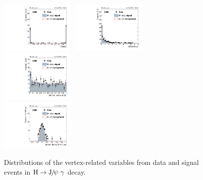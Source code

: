 \begin{figure}[p]
		  \includegraphics[width=0.32\textwidth]{Fig/Final_NoPreliminary/HJpsiG/CosAlpha_Norm_Inclusive}~
		  \includegraphics[width=0.32\textwidth]{Fig/Final_NoPreliminary/HJpsiG/diMuChi2_Norm_Inclusive}~
		  \includegraphics[width=0.32\textwidth]{Fig/Final_NoPreliminary/HJpsiG/VtxProb_Norm_Inclusive}\\
		  \includegraphics[width=0.32\textwidth]{Fig/Final_NoPreliminary/HJpsiG/ctau_narrowAltBins_Inclusive}\\
		
		  \caption{Distributions of the vertex-related variables from data and signal events in $\mathrm{H}\to {\mathrm{J}\hspace{-.08em}/\hspace{-.14em}\psi}\ \gamma$ decay.}
		  \label{fig:vtx_hjpsig}
		\end{figure}
		\clearpage
		
